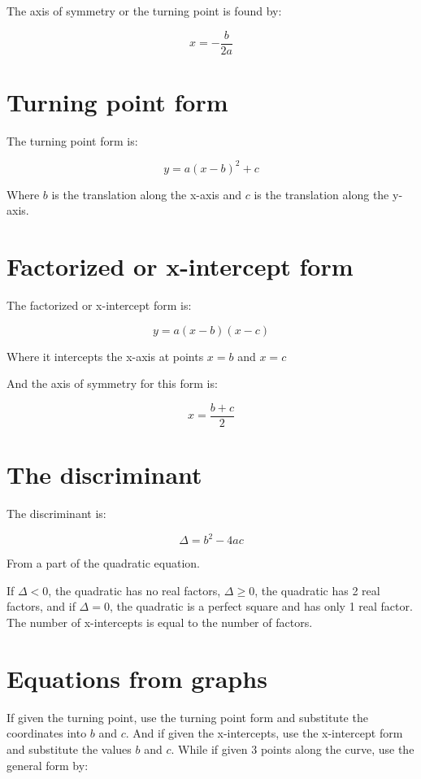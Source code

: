 \documentclass{book}
\begin{document}
The axis of symmetry or the turning point is found by:

\[
	x = -\frac{b}{2a}
\]



\section{Turning point form}
The turning point form is:

\[
	y = a(x - b)^2 + c
\]

Where $b$ is the translation along the x-axis and $c$ is the translation along the y-axis.



\section{Factorized or x-intercept form}
The factorized or x-intercept form is:

\[
	y = a(x - b)(x - c)
\]

Where it intercepts the x-axis at points $x = b$ and $x = c$

And the axis of symmetry for this form is:

\[
	x = \frac{b + c}{2}
\]



\section{The discriminant}
The discriminant is:

\[
	\Delta = b^2 - 4ac
\]

From a part of the quadratic equation.

If $\Delta < 0$, the quadratic has no real factors, $\Delta \geq 0$, the quadratic has 2 real factors, and if $\Delta = 0$, the quadratic is a perfect square and has only 1 real factor.  The number of x-intercepts is equal to the number of factors.



\section{Equations from graphs}
If given the turning point, use the turning point form and substitute the coordinates into $b$ and $c$.  And if given the x-intercepts, use the x-intercept form and substitute the values $b$ and $c$.  While if given 3 points along the curve, use the general form by:
\end{document}
